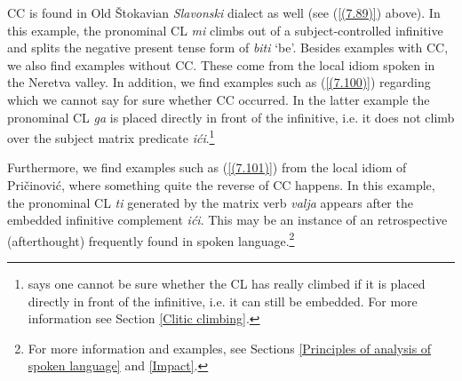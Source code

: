CC is found in Old Štokavian \textit{Slavonski} dialect as well (see (\ref{(7.89)}) above). In this example, the pronominal CL \textit{mi} climbs out of a subject-controlled infinitive and splits the negative present tense form of \textit{biti} ‘be’. Besides examples with CC, we also find examples without CC. These come from the local idiom spoken in the Neretva valley. In addition, we find examples such as (\ref{(7.100)}) regarding which we cannot say for sure whether CC occurred. In the latter example the pronominal CL \textit{ga} is placed directly in front of the infinitive, i.e. it does not climb over the subject matrix predicate \textit{ići}.\footnote{\citet[67]{Junghanns02} says one cannot be sure whether the CL has really climbed if it is placed directly in front of the infinitive, i.e. it can still be embedded. For more information see Section \ref{Clitic climbing}.}


\noindent Furthermore, we find examples such as (\ref{(7.101)}) from the local idiom of Pričinović, where something quite the reverse of CC happens. In this example, the pronominal CL \textit{ti} generated by the matrix verb \textit{valja} appears after the embedded infinitive complement \textit{ići}. This may be an instance of an retrospective (afterthought) frequently found in spoken language.\footnote{For more information and examples, see Sections \ref{Principles of analysis of spoken language} and \ref{Impact}.}



